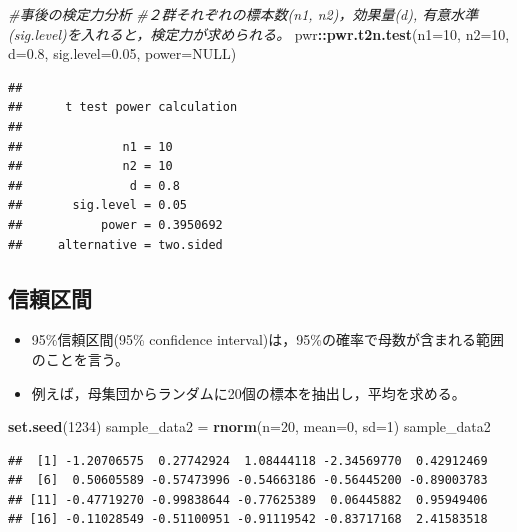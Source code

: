 \documentclass[]{article}
\newenvironment{Shaded}{\begin{snugshade}}{\end{snugshade}}
\newcommand{\KeywordTok}[1]{\textcolor[rgb]{0.13,0.29,0.53}{\textbf{#1}}}
\newcommand{\DataTypeTok}[1]{\textcolor[rgb]{0.13,0.29,0.53}{#1}}
\newcommand{\DecValTok}[1]{\textcolor[rgb]{0.00,0.00,0.81}{#1}}
\newcommand{\FloatTok}[1]{\textcolor[rgb]{0.00,0.00,0.81}{#1}}
\newcommand{\StringTok}[1]{\textcolor[rgb]{0.31,0.60,0.02}{#1}}
\newcommand{\CommentTok}[1]{\textcolor[rgb]{0.56,0.35,0.01}{\textit{#1}}}
\newcommand{\OtherTok}[1]{\textcolor[rgb]{0.56,0.35,0.01}{#1}}
\newcommand{\OperatorTok}[1]{\textcolor[rgb]{0.81,0.36,0.00}{\textbf{#1}}}
\newcommand{\NormalTok}[1]{#1}
\begin{document}
\begin{Shaded}
\begin{Highlighting}[]
\CommentTok{#事後の検定力分析}
\CommentTok{#２群それぞれの標本数(n1, n2)，効果量(d), 有意水準(sig.level)を入れると，検定力が求められる。}
\NormalTok{pwr}\OperatorTok{::}\KeywordTok{pwr.t2n.test}\NormalTok{(}\DataTypeTok{n1=}\DecValTok{10}\NormalTok{, }\DataTypeTok{n2=}\DecValTok{10}\NormalTok{, }\DataTypeTok{d=}\FloatTok{0.8}\NormalTok{, }\DataTypeTok{sig.level=}\FloatTok{0.05}\NormalTok{, }\DataTypeTok{power=}\OtherTok{NULL}\NormalTok{)}
\end{Highlighting}
\end{Shaded}

\begin{verbatim}
## 
##      t test power calculation 
## 
##              n1 = 10
##              n2 = 10
##               d = 0.8
##       sig.level = 0.05
##           power = 0.3950692
##     alternative = two.sided
\end{verbatim}

\subsection{信頼区間}

\begin{itemize}
\item
  95\%信頼区間(95\% confidence
  interval)は，95\%の確率で母数が含まれる範囲のことを言う。
\item
  例えば，母集団からランダムに20個の標本を抽出し，平均を求める。
\end{itemize}

\begin{Shaded}
\begin{Highlighting}[]
\KeywordTok{set.seed}\NormalTok{(}\DecValTok{1234}\NormalTok{)}
\NormalTok{sample_data2 =}\StringTok{ }\KeywordTok{rnorm}\NormalTok{(}\DataTypeTok{n=}\DecValTok{20}\NormalTok{, }\DataTypeTok{mean=}\DecValTok{0}\NormalTok{, }\DataTypeTok{sd=}\DecValTok{1}\NormalTok{)}
\NormalTok{sample_data2}
\end{Highlighting}
\end{Shaded}

\begin{verbatim}
##  [1] -1.20706575  0.27742924  1.08444118 -2.34569770  0.42912469
##  [6]  0.50605589 -0.57473996 -0.54663186 -0.56445200 -0.89003783
## [11] -0.47719270 -0.99838644 -0.77625389  0.06445882  0.95949406
## [16] -0.11028549 -0.51100951 -0.91119542 -0.83717168  2.41583518
\end{verbatim}
\end{document}
